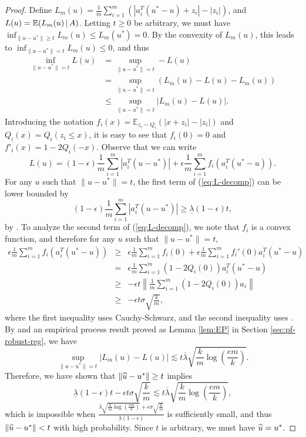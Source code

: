 \begin{proof}
Define $L_m(u)=\frac{1}{m}\sum_{i=1}^m(|a_i^T(u^*-u)+z_i|-|z_i|)$, and $L(u)=\mathbb{E}(L_m(u) \,|\, A)$.
Letting $t\geq 0$ be arbitrary, we must have $\inf_{\|u-u^*\|\geq t}L_m(u)\leq L_m(u^*)=0$. By the convexity of $L_m(u)$, this leads to $\inf_{\|u-u^*\|= t}L_m(u)\leq 0$, and thus
\begin{align*}
\inf_{\|u-u^*\|=t}L(u) &= \sup_{\|u-u^*\|=t} - L(u)\\
& = \sup_{\|u-u^*\|=t} \left( L_m(u) - L(u) - L_m(u)\right) \\
& \leq \sup_{\|u-u^*\|=t}|L_m(u)-L(u)|.
\end{align*}
Introducing the notation $f_i(x)=\mathbb{E}_{z_i\sim Q_i}(|x+z_i|-|z_i|)$ and $Q_i(x)=Q_i(z_i\leq x)$,
it is easy to see that $f_i(0)=0$ and $f'_i(x)=1-2Q_i(-x)$. Observe that we can write
\begin{equation}
L(u)=(1-\epsilon)\frac{1}{m}\sum_{i=1}^m|a_i^T(u-u^*)| + \epsilon\frac{1}{m}\sum_{i=1}^mf_i(a_i^T(u^*-u)). \label{eq:L-decomp}
\end{equation}
For any $u$ such that $\|u-u^*\|=t$, the first term of (\ref{eq:L-decomp}) can be lower bounded by
$$(1-\epsilon)\frac{1}{m}\sum_{i=1}^m|a_i^T(u-u^*)| \geq \underline{\lambda}(1-\epsilon)t,$$
by \conditionB. To analyze the second term of (\ref{eq:L-decomp}), we note that $f_i$ is a convex function, and therefore
for any $u$ such that $\|u-u^*\|=t$,
\begin{eqnarray*}
\epsilon\frac{1}{m}\sum_{i=1}^mf_i(a_i^T(u^*-u)) &\geq& \epsilon\frac{1}{m}\sum_{i=1}^mf_i(0) + \epsilon\frac{1}{m}\sum_{i=1}^mf_i'(0)a_i^T(u^*-u) \\
&=& \epsilon\frac{1}{m}\sum_{i=1}^m\left(1-2Q_i(0)\right)a_i^T(u^*-u) \\
&\geq& -\epsilon t\left\|\frac{1}{m}\sum_{i=1}^m\left(1-2Q_i(0)\right)a_i\right\| \\
&\geq& -\epsilon t\sigma\sqrt{\frac{k}{m}},
\end{eqnarray*}
where the first inequality uses Cauchy-Schwarz, and the second inequality uses \conditionA.
By \conditionB{} and an empirical process result proved as Lemma \ref{lem:EP} in Section \ref{sec:pf-robust-reg}, we have
\begin{equation}
\sup_{\|u-u^*\|= t}|L_m(u)-L(u)| \lesssim t\overline{\lambda}\sqrt{\frac{k}{m}\log\left(\frac{em}{k}\right)}. \label{eq:upper-EP}
\end{equation}
Therefore, we have shown that $\|\widehat{u}-u^*\|\geq t$ implies
$$\underline{\lambda}(1-\epsilon)t - \epsilon t\sigma\sqrt{\frac{k}{m}} \lesssim t\overline{\lambda}\sqrt{\frac{k}{m}\log\left(\frac{em}{k}\right)},$$
which is impossible when $\frac{\overline{\lambda}\sqrt{\frac{k}{m}\log\left(\frac{em}{k}\right)}+\epsilon\sigma\sqrt{\frac{k}{m}}}{\underline{\lambda}(1-\epsilon)}$ is sufficiently small, and thus $\|\widehat{u}-u^*\|< t$ with high probability. Since $t$ is arbitrary, we must have $\widehat{u}=u^*$.
\end{proof}

